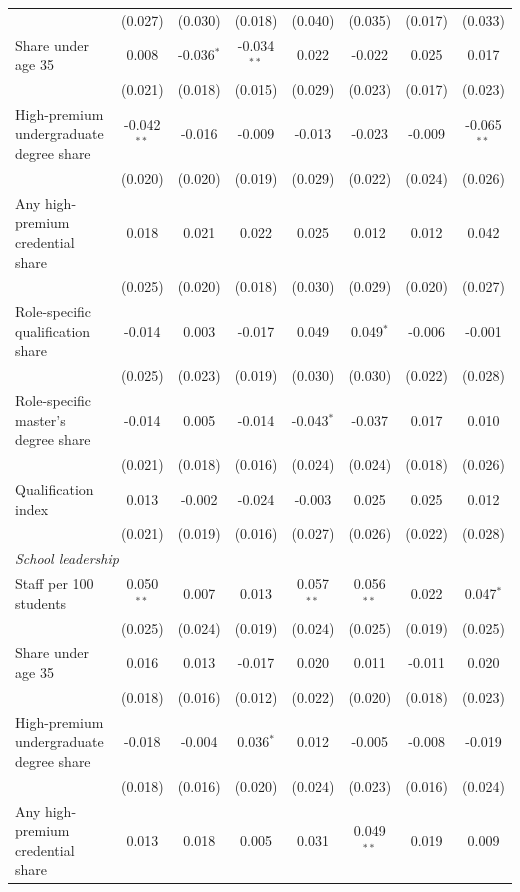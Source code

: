\begin{table}[!htbp]
{\begin{tabular}{lccccccc}
 & (0.027) & (0.030) & (0.018) & (0.040) & (0.035) & (0.017) & (0.033) \\
\quad Share under age 35 & 0.008 & -0.036$^{*}$ & -0.034$^{**}$ & 0.022 & -0.022 & 0.025 & 0.017 \\
 & (0.021) & (0.018) & (0.015) & (0.029) & (0.023) & (0.017) & (0.023) \\
\quad High-premium undergraduate degree share & -0.042$^{**}$ & -0.016 & -0.009 & -0.013 & -0.023 & -0.009 & -0.065$^{**}$ \\
 & (0.020) & (0.020) & (0.019) & (0.029) & (0.022) & (0.024) & (0.026) \\
\quad Any high-premium credential share & 0.018 & 0.021 & 0.022 & 0.025 & 0.012 & 0.012 & 0.042 \\
 & (0.025) & (0.020) & (0.018) & (0.030) & (0.029) & (0.020) & (0.027) \\
\quad Role-specific qualification share & -0.014 & 0.003 & -0.017 & 0.049 & 0.049$^{*}$ & -0.006 & -0.001 \\
 & (0.025) & (0.023) & (0.019) & (0.030) & (0.030) & (0.022) & (0.028) \\
\quad Role-specific master's degree share & -0.014 & 0.005 & -0.014 & -0.043$^{*}$ & -0.037 & 0.017 & 0.010 \\
 & (0.021) & (0.018) & (0.016) & (0.024) & (0.024) & (0.018) & (0.026) \\
\quad Qualification index & 0.013 & -0.002 & -0.024 & -0.003 & 0.025 & 0.025 & 0.012 \\
 & (0.021) & (0.019) & (0.016) & (0.027) & (0.026) & (0.022) & (0.028) \\
\multicolumn{8}{l}{\textit{School leadership}} \\
\quad Staff per 100 students & 0.050$^{**}$ & 0.007 & 0.013 & 0.057$^{**}$ & 0.056$^{**}$ & 0.022 & 0.047$^{*}$ \\
 & (0.025) & (0.024) & (0.019) & (0.024) & (0.025) & (0.019) & (0.025) \\
\quad Share under age 35 & 0.016 & 0.013 & -0.017 & 0.020 & 0.011 & -0.011 & 0.020 \\
 & (0.018) & (0.016) & (0.012) & (0.022) & (0.020) & (0.018) & (0.023) \\
\quad High-premium undergraduate degree share & -0.018 & -0.004 & 0.036$^{*}$ & 0.012 & -0.005 & -0.008 & -0.019 \\
 & (0.018) & (0.016) & (0.020) & (0.024) & (0.023) & (0.016) & (0.024) \\
\quad Any high-premium credential share & 0.013 & 0.018 & 0.005 & 0.031 & 0.049$^{**}$ & 0.019 & 0.009 \\

\end{tabular}}
\end{table}
